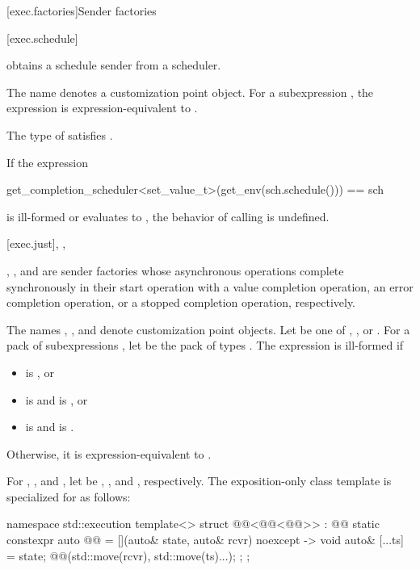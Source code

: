 [exec.factories]{Sender factories}

[exec.schedule]{}

\pnum
{} obtains a schedule sender
from a scheduler.

\pnum
The name  denotes a customization point object.
For a subexpression ,
the expression  is expression-equivalent to
.

\pnum
\mandates
The type of  satisfies .

\pnum
If the expression
\begin{codeblock}
get_completion_scheduler<set_value_t>(get_env(sch.schedule())) == sch
\end{codeblock}
is ill-formed or evaluates to ,
the behavior of calling  is undefined.

[exec.just]{, , }

\pnum
{}, , and  are sender factories
whose asynchronous operations complete synchronously in their start operation
with a value completion operation,
an error completion operation, or
a stopped completion operation, respectively.

\pnum
The names , , and  denote
customization point objects.
Let  be one of
, , or .
For a pack of subexpressions ,
let  be the pack of types .
The expression  is ill-formed if
\begin{itemize}
\item
{} is , or
\item
{} is  and
 is , or
\item
{} is  and
 is .
\end{itemize}

Otherwise, it is expression-equivalent to
.

For , , and ,
let  be
, , and , respectively.
The exposition-only class template 
is specialized for  as follows:
\begin{codeblock}
namespace std::execution {
  template<>
  struct @@<@@<@@>> : @@ {
    static constexpr auto @@ =
      [](auto& state, auto& rcvr) noexcept -> void {
        auto& [...ts] = state;
        @@(std::move(rcvr), std::move(ts)...);
      };
  };
}
\end{codeblock}

